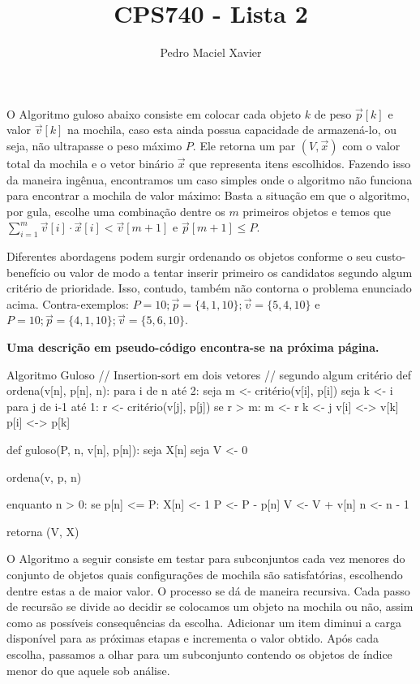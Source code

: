 \documentclass{homework}
\title{CPS740 - Lista 2}
\author{Pedro Maciel Xavier}
\begin{document}
	
	\maketitle
	
	\quest
	
	\subsubquest O Algoritmo guloso abaixo consiste em colocar cada objeto $k$ de peso $\vec{p}[k]$ e valor $\vec{v}[k]$ na mochila, caso esta ainda possua capacidade de armazená-lo, ou seja, não ultrapasse o peso máximo $P$. Ele retorna um par $(V, \vec{x})$ com o valor total da mochila e o vetor binário $\vec{x}$ que representa itens escolhidos. Fazendo isso da maneira ingênua, encontramos um caso simples onde o algoritmo não funciona para encontrar a mochila de valor máximo: Basta a situação em que o algoritmo, por gula, escolhe uma combinação dentre os $m$ primeiros objetos e temos que $\sum_{i=1}^{m} \vec{v}[i] \cdot \vec{x}[i] < \vec{v}[m + 1]$ e $\vec{p}[m + 1] \le P$.\par
	
	Diferentes abordagens podem surgir ordenando os objetos conforme o seu custo-benefício ou valor de modo a tentar inserir primeiro os candidatos segundo algum critério de prioridade. Isso, contudo, também não contorna o problema enunciado acima. Contra-exemplos: $P = 10; \vec{p} = \{4, 1, 10\}; \vec{v} = \{5, 4, 10\}$ e $P = 10; \vec{p} = \{4, 1, 10\}; \vec{v} = \{5, 6, 10\}$.\par
	
	\textbf{Uma descrição em pseudo-código encontra-se na próxima página.}
	
	\newpage
	
	\begin{algor}{Algoritmo Guloso}
	// Insertion-sort em dois vetores
	// segundo algum critério
	def ordena(v[n], p[n], n):
		para i de n até 2:
			seja m <- critério(v[i], p[i])
			seja k <- i
			para j de i-1 até 1:
				r <- critério(v[j], p[j])
				se r > m:
					m <- r
					k <- j
			v[i] <-> v[k]
			p[i] <-> p[k]
	
	def guloso(P, n, v[n], p[n]):
		seja X[n]
		seja V <- 0	
			
		ordena(v, p, n)

		enquanto n > 0:
			se p[n] <= P:
				X[n] <- 1
				P <- P - p[n]
				V <- V + v[n]
			n <- n - 1
			
		retorna (V, X)
		
	\end{algor}

	\newpage
	
	\subsubquest O Algoritmo a seguir consiste em testar para subconjuntos cada vez menores do conjunto de objetos quais configurações de mochila são satisfatórias, escolhendo dentre estas a de maior valor. O processo se dá de maneira recursiva. Cada passo de recursão se divide ao decidir se colocamos um objeto na mochila ou não, assim como as possíveis consequências da escolha. Adicionar um item diminui a carga disponível para as próximas etapas e incrementa o valor obtido. Após cada escolha, passamos a olhar para um subconjunto contendo os objetos de índice menor do que aquele sob análise.\par
	
\end{document}
